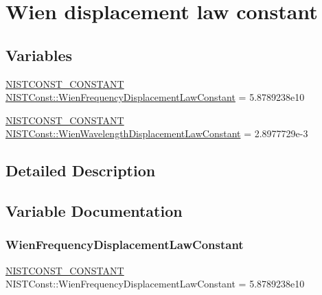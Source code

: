 \hypertarget{group___n_i_s_t_const-_wien_displacement}{}\section{Wien displacement law constant}
\label{group___n_i_s_t_const-_wien_displacement}
\subsection*{Variables}
\begin{DoxyCompactItemize}
\item 
\mbox{\hyperlink{group___n_i_s_t_const-_macros_ga2b0fc1d7452373f816175dd86ce26729}{N\+I\+S\+T\+C\+O\+N\+S\+T\+\_\+\+C\+O\+N\+S\+T\+A\+NT}} \mbox{\hyperlink{group___n_i_s_t_const-_wien_displacement_gaa436196a2e227da87e5138210d00ca3c}{N\+I\+S\+T\+Const\+::\+Wien\+Frequency\+Displacement\+Law\+Constant}} = 5.\+8789238e10
\item 
\mbox{\hyperlink{group___n_i_s_t_const-_macros_ga2b0fc1d7452373f816175dd86ce26729}{N\+I\+S\+T\+C\+O\+N\+S\+T\+\_\+\+C\+O\+N\+S\+T\+A\+NT}} \mbox{\hyperlink{group___n_i_s_t_const-_wien_displacement_gaad844adb8bf7d8300587cb2892b430d8}{N\+I\+S\+T\+Const\+::\+Wien\+Wavelength\+Displacement\+Law\+Constant}} = 2.\+8977729e-\/3
\end{DoxyCompactItemize}


\subsection{Detailed Description}


\subsection{Variable Documentation}
\mbox{\label{group___n_i_s_t_const-_wien_displacement_gaa436196a2e227da87e5138210d00ca3c}} 
\subsubsection{\texorpdfstring{Wien\+Frequency\+Displacement\+Law\+Constant}{WienFrequencyDisplacementLawConstant}}
{\footnotesize\ttfamily \mbox{\hyperlink{group___n_i_s_t_const-_macros_ga2b0fc1d7452373f816175dd86ce26729}{N\+I\+S\+T\+C\+O\+N\+S\+T\+\_\+\+C\+O\+N\+S\+T\+A\+NT}} N\+I\+S\+T\+Const\+::\+Wien\+Frequency\+Displacement\+Law\+Constant = 5.\+8789238e10}

